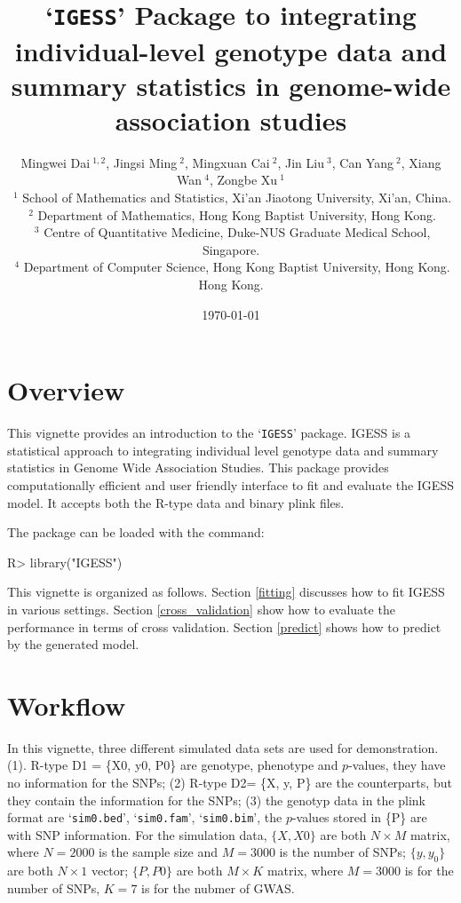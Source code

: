 \documentclass[11pt]{article}
\title{`\texttt{IGESS}' Package to integrating individual-level genotype data and summary statistics in genome-wide association studies}
\author{Mingwei Dai$~^{1,2}$, Jingsi Ming$~^2$, Mingxuan Cai$~^2$, Jin Liu$~^3$, Can Yang$~^2$, Xiang Wan$~^4$, Zongbe Xu$~^1$\\
$~^1$ School of Mathematics and Statistics, Xi'an Jiaotong University, Xi'an, China.\\
$~^2$ Department of Mathematics, Hong Kong Baptist University, Hong Kong.\\
$~^3$ Centre of Quantitative Medicine, Duke-NUS Graduate Medical School, Singapore.\\
$~^4$ Department of Computer Science, Hong Kong Baptist University, Hong Kong.\\
Hong Kong.\\
}
\date{\today}
\begin{document}

\maketitle
\section{Overview}

This vignette provides an introduction to the `\texttt{IGESS}' package.
IGESS is a statistical approach to integrating individual level genotype data and summary statistics in Genome Wide Association Studies. This package provides computationally efficient and user friendly interface to fit and evaluate the IGESS model. It accepts both the R-type data and binary plink files.

The package can be loaded with the command:


\begin{Schunk}
\begin{Sinput}
R> library("IGESS")
\end{Sinput}
\end{Schunk}

This vignette is organized as follows.
Section \ref{fitting} discusses how to fit IGESS in various settings.
Section \ref{cross_validation} show how to evaluate the performance in terms of cross validation. Section \ref{predict} shows how to predict by the generated model.


\section{Workflow}\label{workflow}

In this vignette, three different simulated data sets are used for demonstration. (1). R-type D1 = \{X0, y0, P0\} are genotype, phenotype and $p$-values, they have no information for the SNPs; (2) R-type D2= \{X, y, P\} are the counterparts, but they contain the information for the SNPs; (3) the genotyp data in the plink format are `\texttt{sim0.bed}', `\texttt{sim0.fam}', `\texttt{sim0.bim}', the $p$-values stored in \{P\} are with SNP information. For the simulation data, $\{X, X0\}$ are both $N \times M$ matrix, where $N=2000$ is the sample size and $M=3000$ is the number of SNPs; $\{y, y_0\}$ are both $N \times 1$ vector; $\{P, P0\}$ are both $M \times K$ matrix, where $M=3000$ is for the number of SNPs, $K=7$ is for the nubmer of GWAS.
\end{document}
